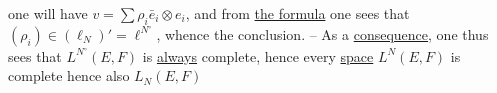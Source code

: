 
one will have $v=\sum\rho_i\bar e_i\otimes e_i$, and from \uline{the  formula} one sees that $(\rho_i)\in(\ell_N)'=\ell^{N^\circ}$, whence the conclusion. -- As a \uline{consequence}, one thus sees that $L^{N^\circ}(E,F)$ is \uline{always} complete, hence every \uline{space} $L^N(E,F)$ is complete hence also $L_N(E,F)$

